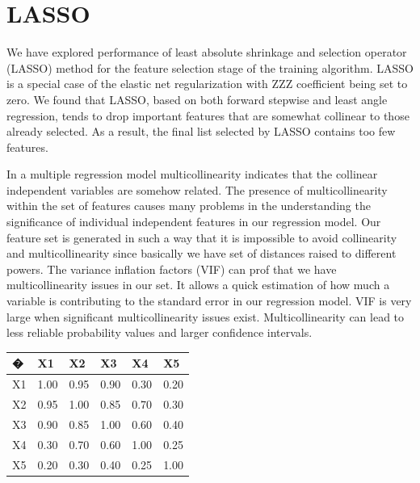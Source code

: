 \documentclass[aps,prl,reprint,amsmath,amssymb,nature]{revtex4-1}
\begin{document}



\newpage
\clearpage
\setcounter{figure}{0}
\setcounter{page}{1}
\renewcommand{\thefigure}{S\arabic{figure}}


\section{LASSO} 

We have explored performance of least absolute 
shrinkage and selection operator (LASSO) method for the feature 
selection stage of the training algorithm. LASSO is a special case of 
the elastic net regularization with ZZZ coefficient being set to zero. 
We found that LASSO, based on both forward stepwise and least angle 
regression, tends to drop important features that are somewhat collinear 
to those already selected. As a result, the final list selected by LASSO 
contains too few features.

In a multiple regression model multicollinearity indicates that the 
collinear independent variables are somehow related. The presence of 
multicollinearity within the set of features causes many problems in the 
understanding the significance of individual independent features in our 
regression model. Our feature set is generated in such a way that it is 
impossible to avoid collinearity and multicollinearity since basically 
we have set of distances raised to different powers. The variance 
inflation factors (VIF) can prof that we have multicollinearity issues 
in our set. It allows a quick estimation of how much a variable is 
contributing to the standard error in our regression model. VIF is very 
large when significant multicollinearity issues exist. Multicollinearity 
can lead to less reliable probability values and larger confidence 
intervals.

\begin{table}[h]
\centering
\begin{tabular}{|l|l|l|l|l|l|}
\hline
� & X1 & X2 & X3 & X4 & X5 \\
\hline
X1 & 1.00 & 0.95 & 0.90 & 0.30 & 0.20 \\
\hline
X2 & 0.95 & 1.00 & 0.85 & 0.70 & 0.30 \\
\hline
X3 & 0.90 & 0.85 & 1.00 & 0.60 & 0.40 \\
\hline
X4 & 0.30 & 0.70 & 0.60 & 1.00 & 0.25 \\
\hline
X5 & 0.20 & 0.30 & 0.40 & 0.25 & 1.00 \\
\hline
\end{tabular}
\end{table}
\end{document}
